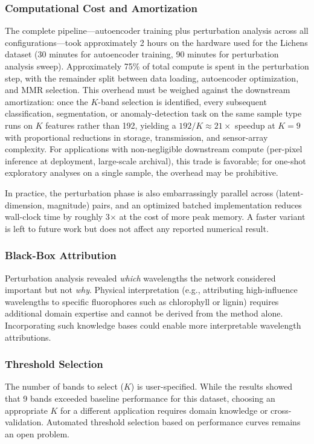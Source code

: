 \subsubsection{Computational Cost and Amortization}
The complete pipeline---autoencoder training plus perturbation analysis across all configurations---took approximately 2 hours on the hardware used for the Lichens dataset (30 minutes for autoencoder training, 90 minutes for perturbation analysis sweep).
Approximately 75\% of total compute is spent in the perturbation step, with the remainder split between data loading, autoencoder optimization, and MMR selection.
This overhead must be weighed against the downstream amortization: once the $K$-band selection is identified, every subsequent classification, segmentation, or anomaly-detection task on the same sample type runs on $K$ features rather than 192, yielding a $192/K \approx 21\times$ speedup at $K=9$ with proportional reductions in storage, transmission, and sensor-array complexity.
For applications with non-negligible downstream compute (per-pixel inference at deployment, large-scale archival), this trade is favorable; for one-shot exploratory analyses on a single sample, the overhead may be prohibitive.

In practice, the perturbation phase is also embarrassingly parallel across (latent-dimension, magnitude) pairs, and an optimized batched implementation reduces wall-clock time by roughly 3$\times$ at the cost of more peak memory.
A faster variant is left to future work but does not affect any reported numerical result.

\subsubsection{Black-Box Attribution}
Perturbation analysis revealed \emph{which} wavelengths the network considered important but not \emph{why}.
Physical interpretation (e.g., attributing high-influence wavelengths to specific fluorophores such as chlorophyll or lignin) requires additional domain expertise \cite{meysurova2021optical} and cannot be derived from the method alone.
Incorporating such knowledge bases could enable more interpretable wavelength attributions.

\subsubsection{Threshold Selection}
The number of bands to select ($K$) is user-specified.
While the results showed that 9 bands exceeded baseline performance for this dataset, choosing an appropriate $K$ for a different application requires domain knowledge or cross-validation.
Automated threshold selection based on performance curves remains an open problem.

